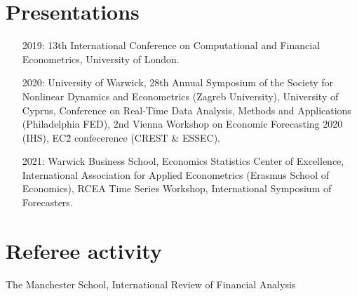 \documentclass[a4paper,12pt]{article}
\begin{document}
\section{Presentations}
\begin{itemize}
    \item[2019:] 13th International Conference on Computational and Financial Econometrics, University of London.
    \item[2020:] University of Warwick, 28th Annual Symposium of the Society for Nonlinear Dynamics and Econometrics (Zagreb University), University of Cyprus, Conference on Real-Time Data Analysis, Methods and Applications (Philadelphia FED), 2nd Vienna Workshop on Economic Forecasting 2020 (IHS), EC\^2 confecerence (CREST \& ESSEC).
    \item[2021:] Warwick Business School, Economics Statistics Center of Excellence, International Association for Applied Econometrics (Erasmus School of Economics),  RCEA Time Series Workshop, International Symposium of Forecasters.
\end{itemize}

\section{Referee activity}
The Manchester School, International Review of Financial Analysis
\end{document}
